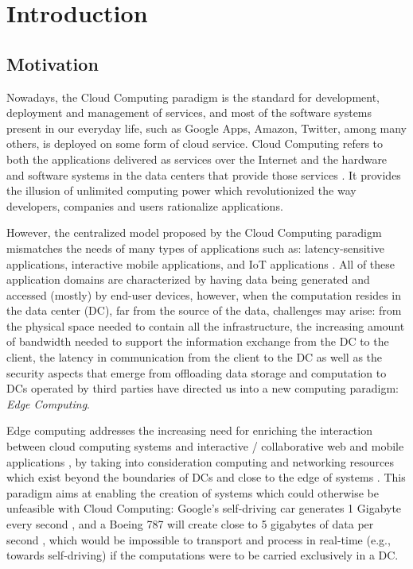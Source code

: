 \newcommand{\novathesis}{\emph{novathesis}}
\newcommand{\novathesisclass}{\texttt{novathesis.cls}}

\chapter{Introduction}
\label{cha:introduction}

\section{Motivation}

Nowadays, the Cloud Computing paradigm is the standard for development, deployment and management of services, and most of the software systems present in our everyday life, such as Google Apps, Amazon, Twitter, among many others, is deployed on some form of cloud service. Cloud Computing refers to both the applications delivered as services over the Internet and the hardware and software systems in the data centers that provide those services \cite{10.1145/1721654.1721672}. It provides the illusion of unlimited computing power which revolutionized the way developers, companies and users rationalize applications.

However, the centralized model proposed by the Cloud Computing paradigm mismatches the needs of many types of applications  such as: latency-sensitive applications, interactive mobile applications, and IoT applications \cite{10.1145/3154815}. All of these application domains are characterized by having data being generated and accessed (mostly) by end-user devices, however, when the computation resides in the data center (DC), far from the source of the data, challenges may arise: from the physical space needed to contain all the infrastructure, the increasing amount of bandwidth needed to support the information exchange from the DC to the client, the latency in communication from the client to the DC as well as the security aspects that emerge from offloading data storage and computation to DCs operated by third parties have directed us into a new computing paradigm: \textit{Edge Computing}.

Edge computing addresses the increasing need for enriching the interaction between cloud computing systems and interactive / collaborative web and mobile applications \cite{} , by taking into consideration  computing and networking resources which exist beyond the boundaries of DCs and close to the edge of systems \cite{Leitao2018} \cite{7488250}. This paradigm aims at enabling the creation of systems which could otherwise be unfeasible with Cloud Computing: Google's self-driving car generates 1 Gigabyte every second \cite{datafloq}, and a Boeing 787 will create close to 5 gigabytes of data per second \cite{finnegan_2013}, which would be impossible to transport and process in real-time (e.g., towards self-driving) if the computations were to be carried exclusively in a DC. 

